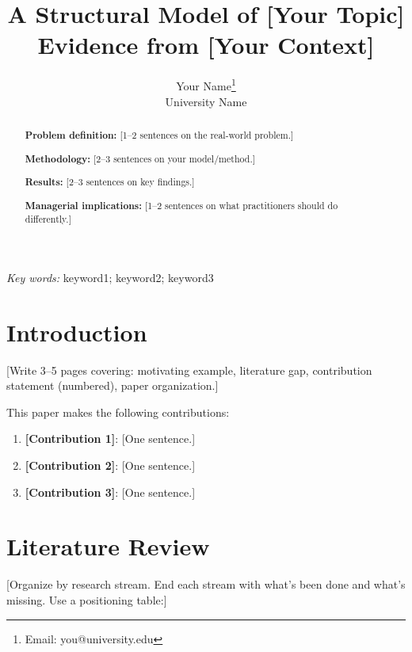 \documentclass[12pt,letterpaper]{article}
\title{\bfseries A Structural Model of [Your Topic]\\{\large Evidence from [Your Context]}}
\author{Your Name\thanks{Email: you@university.edu}\\University Name}
\date{}
\theoremstyle{definition}
\begin{document}
\maketitle

\begin{abstract}
\noindent
\textbf{Problem definition:} [1--2 sentences on the real-world problem.]

\textbf{Methodology:} [2--3 sentences on your model/method.]

\textbf{Results:} [2--3 sentences on key findings.]

\textbf{Managerial implications:} [1--2 sentences on what practitioners should do differently.]
\end{abstract}

\vspace{1em}
\noindent\textit{Key words:} keyword1; keyword2; keyword3

\newpage

\section{Introduction}

[Write 3--5 pages covering: motivating example, literature gap, contribution statement (numbered), paper organization.]

This paper makes the following contributions:

\begin{enumerate}
    \item \textbf{[Contribution 1]}: [One sentence.]
    \item \textbf{[Contribution 2]}: [One sentence.]
    \item \textbf{[Contribution 3]}: [One sentence.]
\end{enumerate}

\section{Literature Review}

[Organize by research stream. End each stream with what's been done and what's missing. Use a positioning table:]
\end{document}
